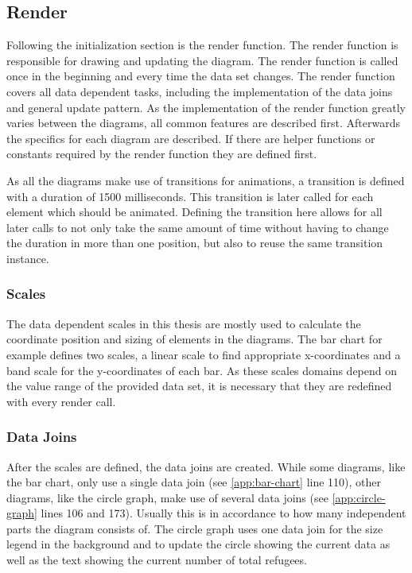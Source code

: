 \subsection{Render}\label{sec:render}
Following the initialization section is the render function. The render function is responsible for drawing and updating the diagram. The render function is called once in the beginning and every time the data set changes. The render function covers all data dependent tasks, including the implementation of the data joins and general update pattern. As the implementation of the render function greatly varies between the diagrams, all common features are described first. Afterwards the specifics for each diagram are described. If there are helper functions or constants required by the render function they are defined first. 

As all the diagrams make use of transitions for animations, a transition is defined with a duration of 1500 milliseconds. This transition is later called for each element which should be animated. Defining the transition here allows for all later calls to not only take the same amount of time without having to change the duration in more than one position, but also to reuse the same transition instance.

\subsubsection{Scales}
The data dependent scales in this thesis are mostly used to calculate the coordinate position and sizing of elements in the diagrams. The bar chart for example defines two scales, a linear scale to find appropriate x-coordinates and a band scale for the y-coordinates of each bar. As these scales domains depend on the value range of the provided data set, it is necessary that they are redefined with every render call.

\subsubsection{Data Joins}
After the scales are defined, the data joins are created. While some diagrams, like the bar chart, only use a single data join (see \ref{app:bar-chart} line 110), other diagrams, like the circle graph, make use of several data joins (see \ref{app:circle-graph} lines 106 and 173). Usually this is in accordance to how many independent parts the diagram consists of. The circle graph uses one data join for the size legend in the background and to update the circle showing the current data as well as the text showing the current number of total refugees.

